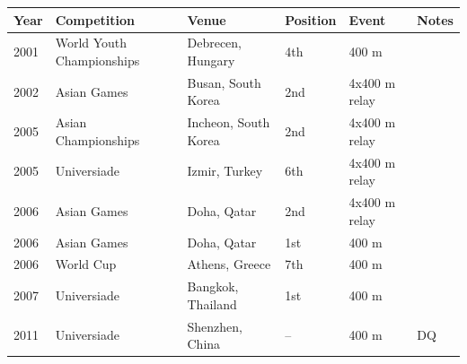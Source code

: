 \documentclass{article}
\begin{document}
\begin{tabular}{llllll}
\toprule
Year & Competition & Venue & Position & Event & Notes \\
\midrule
2001 & World Youth Championships & Debrecen, Hungary & 4th & 400 m &  \\
2002 & Asian Games & Busan, South Korea & 2nd & 4x400 m relay &  \\
2005 & Asian Championships & Incheon, South Korea & 2nd & 4x400 m relay &  \\
2005 & Universiade & Izmir, Turkey & 6th & 4x400 m relay &  \\
2006 & Asian Games & Doha, Qatar & 2nd & 4x400 m relay &  \\
2006 & Asian Games & Doha, Qatar & 1st & 400 m &  \\
2006 & World Cup & Athens, Greece & 7th & 400 m &  \\
2007 & Universiade & Bangkok, Thailand & 1st & 400 m &  \\
2011 & Universiade & Shenzhen, China & – & 400 m & DQ \\
\bottomrule
\end{tabular}
\end{document}
